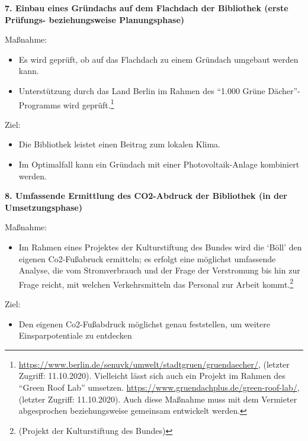 \documentclass[a4paper,
fontsize=11pt,
oneside,
numbers=noperiodatend,
parskip=half-,
bibliography=totoc,
final
]{scrartcl}
\begin{document}
\textbf{7. Einbau eines Gründachs auf dem Flachdach der Bibliothek
(erste Prüfungs- beziehungsweise Planungsphase)}

Maßnahme:

\begin{itemize}[itemsep=-5pt]

\item
  Es wird geprüft, ob auf das Flachdach zu einem Gründach umgebaut
  werden kann.
\item
  Unterstützung durch das Land Berlin im Rahmen des \enquote{1.000 Grüne
  Dächer}-Programms wird geprüft.\footnote{\url{https://www.berlin.de/senuvk/umwelt/stadtgruen/gruendaecher/},
    (letzter Zugriff: 11.10.2020). Vielleicht lässt sich auch ein
    Projekt im Rahmen des \enquote{Green Roof Lab} umsetzen.
    \url{https://www.gruendachplus.de/green-roof-lab/}, (letzter
    Zugriff: 11.10.2020). Auch diese Maßnahme muss mit dem Vermieter
    abgesprochen beziehungsweise gemeinsam entwickelt werden.}
\end{itemize}

Ziel:

\begin{itemize}[itemsep=-5pt]

\item
  Die Bibliothek leistet einen Beitrag zum lokalen Klima.
\item
  Im Optimalfall kann ein Gründach mit einer Photovoltaik-Anlage
  kombiniert werden.
\end{itemize}

\textbf{8. Umfassende Ermittlung des CO2-Abdruck der Bibliothek (in der
Umsetzungsphase)}

Maßnahme:

\begin{itemize}[itemsep=-5pt]

\item
  Im Rahmen eines Projektes der Kulturstiftung des Bundes wird die
  \enquote*{Böll} den eigenen Co2-Fußabruck ermitteln; es erfolgt eine
  möglichst umfassende Analyse, die vom Stromverbrauch und der Frage der
  Verstromung bis hin zur Frage reicht, mit welchen Verkehrsmitteln das
  Personal zur Arbeit kommt.\footnote{(Projekt der Kulturstiftung des
    Bundes)}
\end{itemize}

Ziel:

\begin{itemize}[itemsep=-5pt]

\item
  Den eigenen Co2-Fußabdruck möglichst genau feststellen, um weitere
  Einsparpotentiale zu entdecken
\end{itemize}
\end{document}
